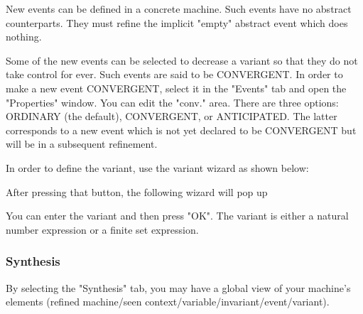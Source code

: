 New events can be defined in a concrete machine. Such events have no abstract counterparts. They must refine the implicit "empty" abstract event which does nothing.

Some of the new events can be selected to decrease a variant so that they do not take control for ever. Such events are said to be CONVERGENT. In order to make a new event CONVERGENT, select it in the "Events" tab and open the "Properties" window. You can edit the "conv." area. There are three options: ORDINARY (the default), CONVERGENT, or ANTICIPATED. The latter corresponds to a new event which is not yet declared to be CONVERGENT but will be in a subsequent refinement.

In order to define the variant, use the variant wizard as shown below:


After pressing that button, the following wizard will pop up


You can enter the variant and then press "OK". The variant is either a natural number expression or a finite set expression. 

\subsubsection{Synthesis}

By selecting the "Synthesis" tab, you may have a global view of your machine's elements (refined machine/seen context/variable/invariant/event/variant).


